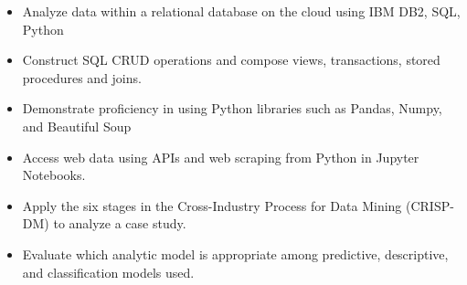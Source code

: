 \documentclass[11pt,a4paper,ragged2e]{altacv}
\begin{document}
\begin{paracol}{1}
\begin{itemize}
\item Analyze data within a relational database on the cloud using IBM DB2, SQL, Python
\item Construct SQL CRUD operations and compose views, transactions, stored procedures and joins.
\end{itemize}
\tightdivider

\begin{itemize}
\item Demonstrate proficiency in using Python libraries such as Pandas, Numpy, and Beautiful Soup
\item Access web data using APIs and web scraping from Python in Jupyter Notebooks.
\end{itemize}
\tightdivider

\begin{itemize}
\item Apply the six stages in the Cross-Industry Process for Data Mining (CRISP-DM) to analyze a case study.
\item Evaluate which analytic model is appropriate among predictive, descriptive, and classification models used.
\end{itemize}
\medskip





\end{paracol}
\end{document}

